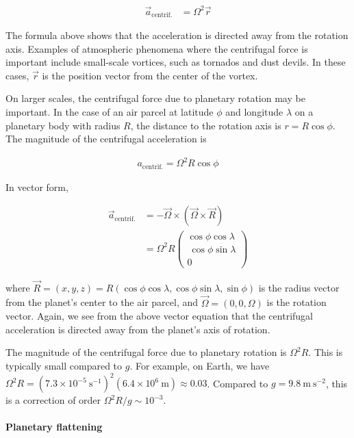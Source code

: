 \documentclass[11pt]{article}
\begin{document}
\begin{align}
    \vec{a}_\mathrm{centrif.} &= \Omega^2 \vec{r}
\end{align}

The formula above shows that the acceleration is directed away from the
rotation axis. Examples of atmospheric phenomena where the centrifugal
force is important include small-scale vortices, such as tornados and
dust devils. In these cases, \(\vec{r}\) is the position vector from the
center of the vortex.

On larger scales, the centrifugal force due to planetary rotation may be
important. In the case of an air parcel at latitude \(\phi\) and
longitude \(\lambda\) on a planetary body with radius \(R\), the
distance to the rotation axis is \(r = R\cos \phi\). The magnitude of
the centrifugal acceleration is

\begin{align}
    a_\mathrm{centrif.} = \Omega^2 R\cos \phi
\end{align}

In vector form,

\begin{align}
    \vec{a}_\mathrm{centrif.} &= -\vec{\Omega} \times \left(\vec{\Omega} \times \vec{R}\right) \\
    &= \Omega^2R \begin{pmatrix} \cos\phi\cos\lambda \\ ~\cos\phi \sin\lambda \\ 0 \end{pmatrix}
\end{align}

where
\(\vec{R} = (x,y,z) = R(\cos\phi\cos\lambda, \cos\phi\sin\lambda, \sin\phi)\)
is the radius vector from the planet's center to the air parcel, and
\(\vec{\Omega} = (0, 0, \Omega)\) is the rotation vector. Again, we see
from the above vector equation that the centrifugal acceleration is
directed away from the planet's axis of rotation.

The magnitude of the centrifugal force due to planetary rotation is
\(\Omega^2 R\). This is typically small compared to \(g\). For example,
on Earth, we have
\(\Omega^2 R = (7.3\times 10^{-5}~\mathrm{s^{-1}})^2(6.4\times 10^6~\mathrm{m}) \approx 0.03\).
Compared to \(g = 9.8~\mathrm{m~s^{-2}}\), this is a correction of order
\(\Omega^2 R/g \sim 10^{-3}\).

\paragraph{Planetary flattening}\label{planetary-flattening}
\end{document}
